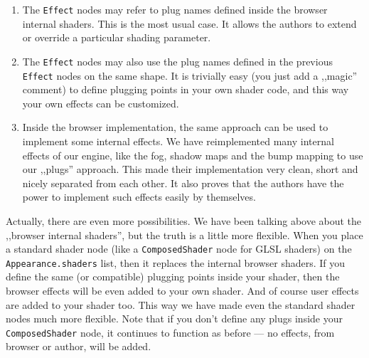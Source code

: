 \documentclass{acmsiggraph}                     %
\begin{document}
\begin{enumerate}

\item The \texttt{Effect} nodes may refer to plug names
defined inside the browser internal shaders. This is the most usual case.
It allows the authors to extend or override a particular shading parameter.

\item The \texttt{Effect} nodes may also use the plug names defined
in the previous \texttt{Effect} nodes on the same shape.
It is trivially easy (you just add a ,,magic'' comment) to define
plugging points in your own shader code, and this way your own effects
can be customized.

\item Inside the browser implementation, the same approach can be used
to implement some internal effects.
We have reimplemented many internal effects of our engine,
like the fog, shadow maps and the bump mapping to use our ,,plugs'' approach.
This made their implementation very clean, short
and nicely separated from each other. It also proves that
the authors have the power to implement such effects easily by themselves.



\end{enumerate}

Actually, there are even more possibilities.
We have been talking above about the ,,browser internal shaders'',
but the truth is a little more flexible.
When you place a standard shader node
(like a \texttt{ComposedShader} node for GLSL shaders) on the
\texttt{Appearance.shaders} list,
then it replaces the internal browser shaders.
If you define the same (or compatible) plugging points inside your shader,
then the browser effects will be even added to your own
shader. And of course user effects are added to your shader too.
This way we have made even the standard shader nodes much more flexible.
Note that if you don't define any plugs inside your \texttt{ComposedShader} node,
it continues to function as before --- no effects, from browser or author,
will be added.
\end{document}
